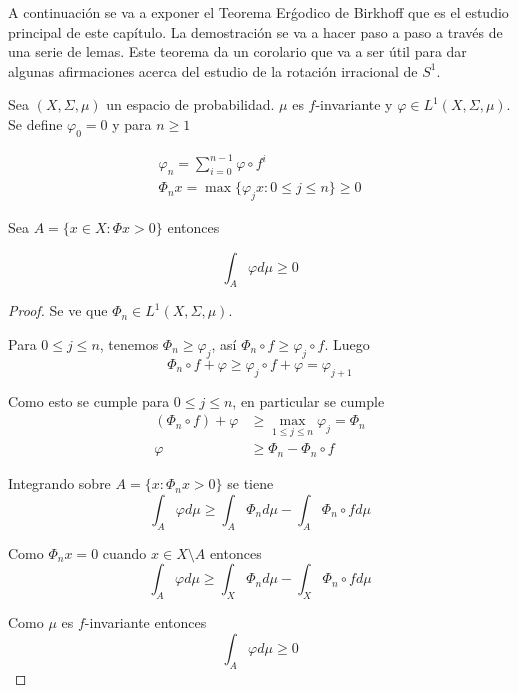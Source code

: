 A continuación se va a exponer el Teorema Erǵodico de Birkhoff que es el estudio principal de este capítulo. La demostración se va a hacer paso a paso a través de una serie de lemas. Este teorema da un corolario que va a ser útil para dar algunas afirmaciones acerca del estudio de la rotación irracional de $S^1$.

\begin{lema}\label{maxima_desigualdad}
	Sea $(X,\Sigma,\mu)$ un espacio de probabilidad. $\mu$ es $f$-invariante y $\varphi \in L^1(X,\Sigma,\mu)$. Se define $\varphi_0 = 0$ y para $n \geq 1$
	
	\begin{gather}
		\varphi_n = \sum_{i=0}^{n-1} \varphi \circ f^i\\
		\varPhi_n x = \max \{\varphi_j x : 0 \leq j \leq n\} \geq 0
	\end{gather}
	
	Sea $A = \{x \in X: \varPhi x > 0 \}$ entonces

	\begin{equation}
		\int_A \varphi d\mu \geq 0
	\end{equation}
\end{lema}

\begin{proof}
	Se ve que $\varPhi_n \in L^1(X,\Sigma,\mu)$. 
	
	Para $0 \leq j \leq n$, tenemos $\varPhi_n \geq \varphi_j$, así $\varPhi_n \circ f \geq \varphi_j \circ f$. Luego
	\begin{equation}
		\varPhi_n \circ f + \varphi \geq \varphi_j \circ f + \varphi = \varphi_{j+1}
	\end{equation}
	
	Como esto se cumple para $0 \leq j \leq n$, en particular se cumple
	\begin{align}
		(\varPhi_n \circ f)  + \varphi  &\geq \max_{1 \leq j \leq n} \varphi_j  = \varPhi_n\\
		\varphi &\geq \varPhi_n - \varPhi_n \circ f 
	\end{align}
	
	Integrando sobre $A= \{x: \varPhi_n x > 0\}$ se tiene
	\begin{equation}
		\int_A \varphi d\mu \geq \int_A \varPhi_n d\mu - \int_A \varPhi_n \circ f d\mu
	\end{equation}
	
	Como $\varPhi_n x = 0$ cuando $x \in X \setminus A$ entonces
	\begin{equation}
		\int_A \varphi d\mu \geq \int_X \varPhi_n d\mu - \int_X \varPhi_n \circ f d\mu
	\end{equation}
	
	Como $\mu$ es $f$-invariante entonces
	\begin{equation}
		\int_A \varphi d\mu \geq 0
	\end{equation}
\end{proof}

